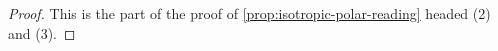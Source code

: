 \begin{proof}
\leanok
This is the part of the proof of \ref{prop:isotropic-polar-reading} headed (2) and (3).
\end{proof}

